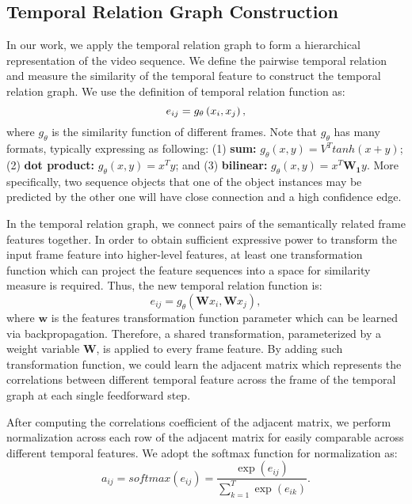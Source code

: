 \documentclass[conference,compsoc]{IEEEtran}
\begin{document}
\subsection{Temporal Relation Graph Construction}
\label{subsec:graph}
    In our work, we apply the temporal relation graph to form a hierarchical representation of the video sequence. We define the pairwise temporal relation and measure the similarity of the temporal feature to construct the temporal relation graph. We use the definition of temporal relation function as:
    \begin{equation}
        \centering
        e_{ij} =  g_{\theta}\left (x_{i}, x_{j} \right ),
        \label{equ:a}
    \end{equation}
    where $g_{\theta}$ is the similarity function of different frames. Note that $g_{\theta}$ has many formats, typically expressing as following:
    (1) \textbf{sum:} $g_{\theta} \left( x, y \right) = V^{T} tanh\left(x + y \right)$;
    (2) \textbf{dot product:} $g_{\theta} \left( x, y \right) = x^{T}y$; and (3) \textbf{bilinear:}
    $g_{\theta} \left( x, y \right) =  x^{T}\mathbf{W_1}y$. More specifically, two sequence objects that one of the object instances may be predicted by the other one will have close connection and a high confidence edge.

    In the temporal relation graph, we connect pairs of the semantically related frame features together. In order to obtain sufficient expressive power to transform the input frame feature into higher-level features, at least one transformation function which can project the feature sequences into a space for similarity measure is required. Thus, the new temporal relation function is:
    \begin{equation}
      e_{ij} = g_{\theta}\left (\mathbf{W}x_{i}, \mathbf{W}x_{j} \right ),  
    \end{equation}
    where $\mathbf{w}$ is the features transformation function parameter which can be learned via backpropagation. Therefore, a shared transformation, parameterized by a weight variable $\mathbf{W}$, is applied to every frame feature. By adding such transformation function, we could learn the adjacent matrix which represents the correlations between different temporal feature across the frame of the temporal graph at each single feedforward step.

    After computing the correlations coefficient of the adjacent matrix, we perform normalization across each row of the adjacent matrix for easily comparable across different temporal features. We adopt the softmax function for normalization as:
    \begin{equation}
        a_{ij} = softmax(e_{ij}) = \frac{\exp \left(e_{ij} \right)}{\sum_{k =1}^{T} \exp \left(e_{ik}\right)}.
        \label{equ:coeff}
    \end{equation}
    
\end{document}
